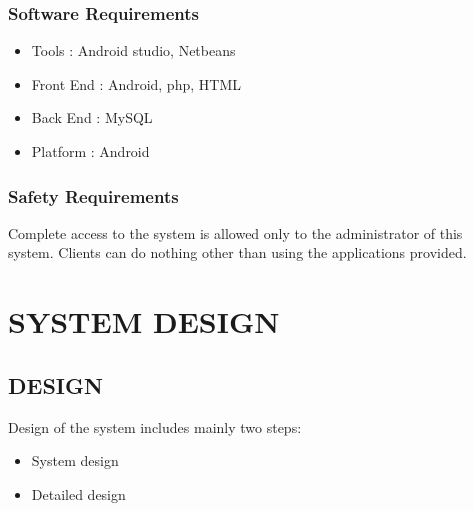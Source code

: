 \documentclass[12pt,a4paper,oneside]{report}
\begin{document}
\subsection{ Software Requirements}
\begin{itemize}
\item Tools : Android studio, Netbeans
\item Front End : Android, php, HTML 
\item Back End : MySQL
\item Platform : Android
\end{itemize}
\subsection{Safety Requirements}
\par Complete access to the system is allowed only to the administrator of this system. Clients can do nothing other than using the applications provided.\\
 
 
\chapter{SYSTEM DESIGN}
\section{DESIGN}
Design of the system includes mainly two steps:
\begin{itemize}
\item{System design}
\item{Detailed design}
\end{itemize}
\end{document}
